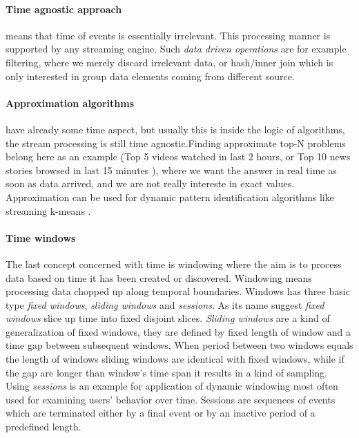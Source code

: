 \paragraph{Time agnostic approach} means that time of events is essentially irrelevant. This processing manner is supported by any streaming engine. Such  \textit{data driven operations} are for example filtering, where we merely discard irrelevant data, or hash/inner join which is only interested in group data elements coming from different source. 
\paragraph{Approximation algorithms} have already some time aspect, but usually this is inside the logic of algorithms, the stream processing is still time agnostic.Finding approximate top-N problems belong here as an example (Top 5 videos watched in last 2 hours, or Top 10 news stories browsed in last 15 minutes ), where we want the answer in real time as soon as data arrived, and we are not really intereste in exact values.\cite{trend}
Approximation can be used for dynamic pattern identification algorithms like streaming k-means \cite{kmean}.
\paragraph{Time windows} The last concept concerned with time is windowing where the aim is to process data based on time it has been created or discovered. Windowing means processing data chopped up along temporal boundaries. Windows has three basic type \textit{fixed windows}, \textit{sliding windows} and \textit{sessions}. As its name suggest \textit{fixed windows} slice up time into fixed disjoint slices. 
\textit{Sliding windows} are a kind of generalization of fixed windows, they are defined by fixed length of window and a time gap between subsequent windows. When period between two windows equals the length of windows sliding windows are identical with fixed windows, while if the gap are longer than window's time span it results in a kind of sampling.
Using \textit{sessions} is an example for application of dynamic windowing most often used for examining users' behavior over time. Sessions are sequences of events which are terminated either by a final event or by an inactive period of a predefined length.

